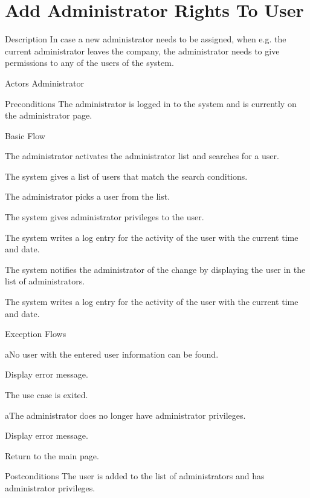 \section{Add Administrator Rights To User}

%
\begin{cpart}{Description}
In case a new administrator needs to be assigned, when e.g. the current administrator  leaves the company, the administrator needs to give permissions to any of the users of the system.
\end{cpart}


%
\begin{cpart}{Actors}
Administrator
\end{cpart}

%
\begin{cpart}{Preconditions}
The administrator is logged in to the system and is currently on the administrator page.
\end{cpart}

%
\begin{cpartList}{Basic Flow}
  \item The administrator activates the administrator list and searches for a user.
  \item The system gives a list of users that match the search conditions.
  \item The administrator picks a user from the list.
  \item The system gives administrator privileges to the user.
  \item The system writes a log entry for the activity of the user with the current time and date.
  \item The system notifies the administrator of the change by displaying the user in the list of administrators.
  \item The system writes a log entry for the activity of the user with the current time and date.
\end{cpartList}

%
\begin{cpartList}{Exception Flows}
  \begin{innerList}{2}{a}{No user with the entered user information can be found.}
    \item Display error message.
    \item The use case is exited.
  \end{innerList}

  \begin{innerList}{4}{a}{The administrator does no longer have administrator privileges.}
    \item Display error message.
    \item Return to the main page.
  \end{innerList}
\end{cpartList}

%
\begin{cpart}{Postconditions}
The user is added to the list of administrators and has administrator privileges.
\end{cpart}

